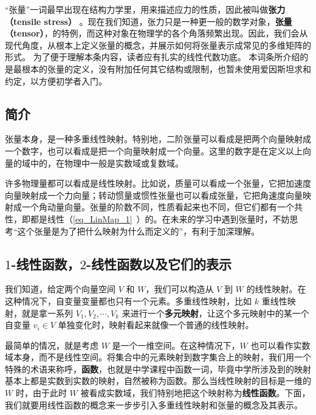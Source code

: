 


“张量”一词最早出现在结构力学里，用来描述应力的性质，因此被叫做\textbf{张力（tensile stress）}%
。现在我们知道，张力只是一种更一般的数学对象，\textbf{张量（tensor）}，的特例，而这种对象在物理学的各个角落频繁出现。因此，我们会从现代角度，从根本上定义张量的概念，并展示如何将张量表示成常见的多维矩阵的形式。 为了便于理解本条内容，读者应有扎实的线性代数功底。 本词条所介绍的是最根本的张量的定义，没有附加任何其它结构或限制，也暂未使用爱因斯坦求和约定，以方便初学者入门。

\subsection{简介}

张量本身，是一种多重线性映射。特别地，二阶张量可以看成是把两个向量映射成一个数字，也可以看成是把一个向量映射成一个向量。这里的数字是在定义以上向量的域中的，在物理中一般是实数域或复数域。

许多物理量都可以看成是线性映射。比如说，质量可以看成一个张量，它把加速度向量映射成一个力向量；转动惯量或惯性张量也可以看成张量，它把角速度向量映射成一个角动量向量。张量的阶数不同，性质看起来也不同，但它们都有一个共性，即都是线性（\autoref{eq_LinMap_1}~）的。在未来的学习中遇到张量时，不妨思考“这个张量是为了把什么映射为什么而定义的”，有利于加深理解。

\subsection{$1$-线性函数，$2$-线性函数以及它们的表示}\label{sub_Tensor_1}

我们知道，给定两个向量空间 $V$ 和 $W$，我们可以构造从 $V$ 到 $W$ 的线性映射。在这种情况下，自变量变量都也只有一个元素。多重线性映射，比如 $k$ 重线性映射，就是拿一系列 $V_1, V_2, \cdots, V_k$ 来进行一个\textbf{多元映射}，让这个多元映射中的某一个自变量 ${v}_i\in V$ 单独变化时，映射看起来就像一个普通的线性映射。

最简单的情况，就是考虑 $W$ 是一个一维空间。在这种情况下，$W$ 也可以看作实数域本身，而不是线性空间。将集合中的元素映射到数字集合上的映射，我们用一个特殊的术语来称呼，\textbf{函数}，也就是中学课程中函数一词，毕竟中学所涉及到的映射基本上都是实数到实数的映射，自然被称为函数。那么当线性映射的目标是一维的 $W$ 时，由于此时 $W$ 被看成实数域，我们特别地把这个映射称为\textbf{线性函数}。下面，我们就要用线性函数的概念来一步步引入多重线性映射和张量的概念及其表示。

